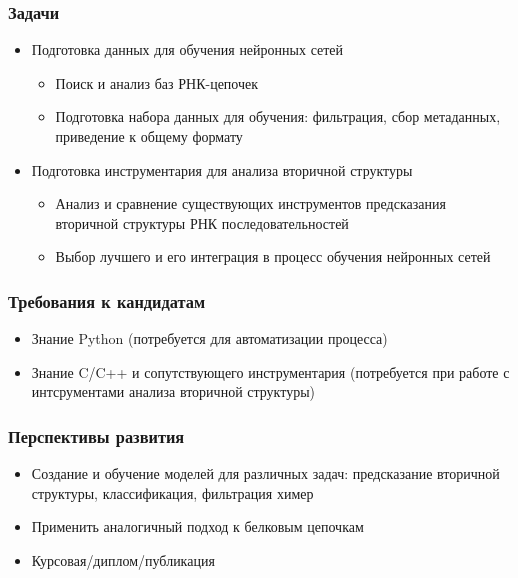 \documentclass[xcolor=table]{beamer}
\begin{document}
\begin{frame} \frametitle{Задачи}
   \begin{itemize}
      \item Подготовка данных для обучения нейронных сетей
      \begin{itemize}
        \item Поиск и анализ баз РНК-цепочек
        \item Подготовка набора данных для обучения: фильтрация, сбор метаданных, приведение к общему формату
      \end{itemize}
      \pause
      \item Подготовка инструментария для анализа вторичной структуры
      \begin{itemize}
        \item Анализ и сравнение существующих инструментов предсказания вторичной структуры РНК последовательностей
        \item Выбор лучшего и его интеграция в процесс обучения нейронных сетей
      \end{itemize}
    \end{itemize}
\end{frame}

\begin{frame} \frametitle{Требования к кандидатам}
   \begin{itemize}
      \item Знание Python (потребуется для автоматизации процесса)
      \item Знание C/C++ и сопутствующего инструментария (потребуется при работе с интсрументами анализа вторичной структуры)
    \end{itemize}
\end{frame}


\begin{frame} \frametitle{Перспективы развития}
   \begin{itemize}
      \item Создание и обучение моделей для различных задач: предсказание вторичной структуры, классификация, фильтрация химер
      \item Применить аналогичный подход к белковым цепочкам
      \item Курсовая/диплом/публикация
    \end{itemize}
\end{frame}
\end{document}
